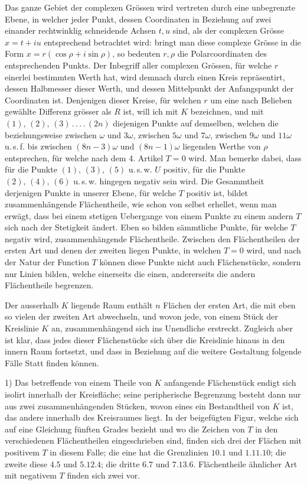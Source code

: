 Das ganze Gebiet der complexen Grössen wird vertreten durch eine unbegrenzte Ebene, in welcher jeder Punkt, dessen Coordinaten in Beziehung auf
zwei einander rechtwinklig schneidende Achsen $t,u$ sind, als der complexen
Grösse $x=t+iu$ entsprechend betrachtet wird: bringt man diese complexe
Grösse in die Form $x=r(\cos\rho+i\sin\rho)$, so bedeuten $r,\rho$ die Polarcoordinaten
des entsprechenden Punkts. Der Inbegriff aller complexen Grössen, für welche
$r$ einerlei bestimmten Werth hat, wird demnach durch einen Kreis repräsentirt,
dessen Halbmesser dieser Werth, und dessen Mittelpunkt der Anfangspunkt der
Coordinaten ist. Denjenigen dieser Kreise, für welchen $r$ um eine nach Belieben gewählte Differenz grösser als $R$ ist, will ich mit $K$ bezeichnen, und mit
$(1),\,(2),\,(3)\,.\,.\,.\,.\,(2n)$ diejenigen Punkte auf demselben, welchen die beziehungsweise zwischen $\omega$ und $3\omega$, zwischen $5\omega$ und $7\omega$, zwischen $9\omega$ und $11\omega$ u.\,s.\,f.
bis zwischen $(8n-3)\omega$ und $(8n-1)\omega$ liegenden Werthe von $\rho$ entsprechen,
für welche nach dem 4. Artikel $T=0$ wird. Man bemerke dabei, dass für die
Punkte $(1),\,(3),\,(5)$ u.\,s.\,w. $U$ positiv, für die Punkte $(2),\,(4),\,(6)$ u.\,s.\,w. hingegen
negativ sein wird.
Die Gesammtheit derjenigen Punkte in unserer Ebene, für welche $T$ positiv ist, bildet zusammenhängende Flächentheile, wie schon von selbst erhellet,
wenn man erwägt, dass bei einem stetigen Uebergange von einem Punkte zu einem andern $T$ sich nach der Stetigkeit ändert. Eben so bilden sämmtliche
Punkte, für welche $T$ negativ wird, zusammenhängende Flächentheile. Zwischen den Flächentheilen der ersten Art und denen der zweiten liegen Punkte, in
welchen $T=0$ wird, und nach der Natur der Function $T$ können diese Punkte
nicht auch Flächenstücke, sondern nur Linien bilden, welche einerseits die einen, andererseits die andern Flächentheile begrenzen.

Der ausserhalb $K$ liegende Raum enthält $n$ Flächen der ersten Art, die mit
eben so vielen der zweiten Art abwechseln, und wovon jede, von einem Stück der
Kreislinie $K$ an, zusammenhängend sich ins Unendliche erstreckt. Zugleich aber
ist klar, dass jedes dieser Flächenstücke sich über die Kreislinie hinaus in den
innern Raum fortsetzt, und dass in Beziehung auf die weitere Gestaltung folgende
Fälle Statt finden können.

1) Das betreffende von einem Theile von $K$ anfangende Flächenstück endigt sich isolirt innerhalb der Kreisfläche; seine peripherische Begrenzung besteht
dann nur aus zwei zusammenhängenden Stücken, wovon eines ein Bestandtheil
von $K$ ist, das andere innerhalb des Kreisraumes liegt. In der beigefügten Figur, welche sich auf eine Gleichung fünften Grades bezieht und wo die Zeichen
von $T$ in den verschiedenen Flächentheilen eingeschrieben sind, finden sich drei
der Flächen mit positivem $T$ in diesem Falle; die eine hat die Grenzlinien $10.1$
und $1.11.10$; die zweite diese $4.5$ und $5.12.4$; die dritte $6.7$ und $7.13.6$.
Flächentheile ähnlicher Art mit negativem $T$ finden sich zwei vor.

